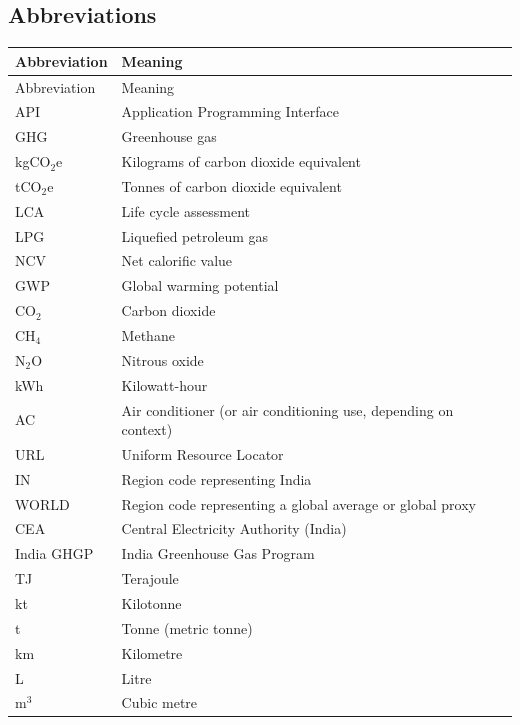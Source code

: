 \documentclass[11pt,a4paper]{article}
\begin{document}
\subsection{Abbreviations}
\begin{longtable}{p{3cm} p{11cm}}
\toprule
Abbreviation & Meaning \\
\midrule
\endfirsthead
\toprule
Abbreviation & Meaning \\
\midrule
\endhead
API & Application Programming Interface \\
GHG & Greenhouse gas \\
kgCO\(_2\)e & Kilograms of carbon dioxide equivalent \\
tCO\(_2\)e & Tonnes of carbon dioxide equivalent \\
LCA & Life cycle assessment \\
LPG & Liquefied petroleum gas \\
NCV & Net calorific value \\
GWP & Global warming potential \\
CO\(_2\) & Carbon dioxide \\
CH\(_4\) & Methane \\
N\(_2\)O & Nitrous oxide \\
kWh & Kilowatt-hour \\
AC & Air conditioner (or air conditioning use, depending on context) \\
URL & Uniform Resource Locator \\
IN & Region code representing India \\
WORLD & Region code representing a global average or global proxy \\
CEA & Central Electricity Authority (India) \\
India GHGP & India Greenhouse Gas Program \\
TJ & Terajoule \\
kt & Kilotonne \\
t & Tonne (metric tonne) \\
km & Kilometre \\
L & Litre \\
m\(^3\) & Cubic metre \\
\bottomrule
\end{longtable}
\end{document}
